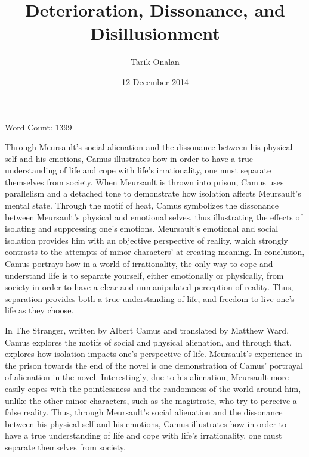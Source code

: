 \documentclass[12pt]{article}
\title{Deterioration, Dissonance, and Disillusionment}
\date{12 December 2014}
\author{Tarik Onalan}
\begin{document}
    \maketitle
    \centerline{Word Count: 1399}
    Through Meursault's social alienation and the dissonance between his
    physical self and his emotions, Camus illustrates how in order to have a true
    understanding of life and cope with life's irrationality, one must separate
    themselves from society. When Meursault is thrown
    into prison, Camus uses parallelism and a detached tone to demonstrate how isolation
    affects Meursault's mental state. Through the motif of heat, Camus symbolizes
    the dissonance between Meursault's physical and emotional selves, thus illustrating
    the effects of isolating and suppressing one's emotions. Meursault's emotional
    and social isolation provides him with an objective perspective of reality, which
    strongly contrasts to the attempts of minor characters' at creating meaning.
    In conclusion, Camus portrays how in a world of irrationality, the only
    way to cope and understand life is to separate yourself, either
    emotionally or physically, from society in order to have a clear and
    unmanipulated perception of reality. Thus, separation provides both a true understanding
    of life, and freedom to live one's life as they choose.

    \newpage

    In The Stranger, written by Albert Camus and
    translated by Matthew Ward, Camus explores the motifs of social and physical
    alienation, and through that, explores how isolation impacts one's perspective
    of life. Meursault's experience in the prison towards the end of the novel is
    one demonstration of Camus' portrayal of alienation in the novel. Interestingly,
    due to his alienation, Meursault more easily copes with the pointlessness and
    the randomness of the world around him, unlike the other minor characters, such
    as the magistrate, who try to perceive a false reality. Thus, through
    Meursault's social alienation and the dissonance between his physical self and
    his emotions, Camus illustrates how in order to have a true understanding of
    life and cope with life's irrationality, one must separate themselves from
    society. \\
\end{document}
